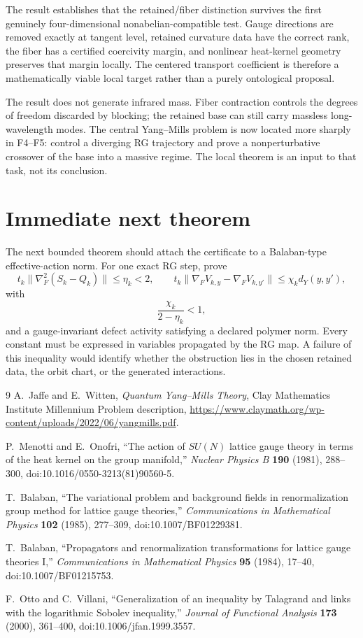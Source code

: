 \documentclass[11pt]{article}
\theoremstyle{remark}
\begin{document}
The result establishes that the retained/fiber distinction survives the first
genuinely four-dimensional nonabelian-compatible test.  Gauge directions are
removed exactly at tangent level, retained curvature data have the correct
rank, the fiber has a certified coercivity margin, and nonlinear heat-kernel
geometry preserves that margin locally.  The centered transport coefficient
is therefore a mathematically viable local target rather than a purely
ontological proposal.

The result does not generate infrared mass.  Fiber contraction controls the
degrees of freedom discarded by blocking; the retained base can still carry
massless long-wavelength modes.  The central Yang--Mills problem is now located
more sharply in F4--F5: control a diverging RG trajectory and prove a
nonperturbative crossover of the base into a massive regime.  The local theorem
is an input to that task, not its conclusion.

\section{Immediate next theorem}

The next bounded theorem should attach the certificate to a Balaban-type
effective-action norm.  For one exact RG step, prove
\[
 t_k\|\nabla_F^2(S_k-Q_k)\|\le\eta_k<2,
 \qquad
 t_k\|\nabla_FV_{k,y}-\nabla_FV_{k,y'}\|
 \le\chi_k d_Y(y,y'),
\]
with
\[
 \frac{\chi_k}{2-\eta_k}<1,
\]
and a gauge-invariant defect activity satisfying a declared polymer norm.
Every constant must be expressed in variables propagated by the RG map.  A
failure of this inequality would identify whether the obstruction lies in the
chosen retained data, the orbit chart, or the generated interactions.

\begin{thebibliography}{9}
A.~Jaffe and E.~Witten,
\emph{Quantum Yang--Mills Theory}, Clay Mathematics Institute Millennium
Problem description,
\url{https://www.claymath.org/wp-content/uploads/2022/06/yangmills.pdf}.

P.~Menotti and E.~Onofri,
``The action of $SU(N)$ lattice gauge theory in terms of the heat kernel on the
group manifold,'' \emph{Nuclear Physics B} \textbf{190} (1981), 288--300,
doi:10.1016/0550-3213(81)90560-5.

T.~Balaban,
``The variational problem and background fields in renormalization group
method for lattice gauge theories,''
\emph{Communications in Mathematical Physics} \textbf{102} (1985), 277--309,
doi:10.1007/BF01229381.

T.~Balaban,
``Propagators and renormalization transformations for lattice gauge theories
I,'' \emph{Communications in Mathematical Physics} \textbf{95} (1984), 17--40,
doi:10.1007/BF01215753.

F.~Otto and C.~Villani,
``Generalization of an inequality by Talagrand and links with the logarithmic
Sobolev inequality,'' \emph{Journal of Functional Analysis} \textbf{173}
(2000), 361--400, doi:10.1006/jfan.1999.3557.
\end{thebibliography}
\end{document}
